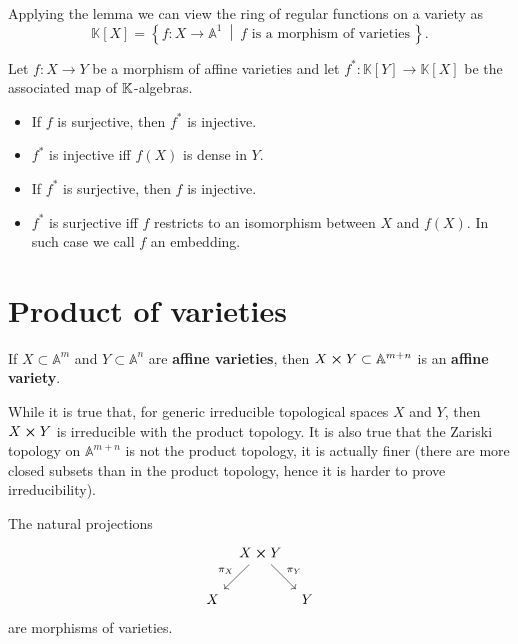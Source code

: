 \begin{rem}
	Applying the lemma we can view the ring of regular functions on a variety as
	\begin{equation}
	\mathbb{K}[X] = \left\{ f: X \to \mathbb{A}^1 \ \middle|\ f  \text{ is a morphism of varieties}\, \right\}
	.\end{equation} 
\end{rem} 

\begin{lem}
	Let $f: X \to Y$ be a morphism of affine varieties and let $f^*: \mathbb{K}[Y] \to \mathbb{K}[X]$ be the associated map of $\mathbb{K}$-algebras.
	\begin{itemize}
		\item If $f$ is surjective, then $f^*$ is injective.
		\item $f^*$ is injective iff $f(X)$ is dense in $Y$.
		\item If $f^*$ is surjective, then $f$ is injective.
		\item $f^*$ is surjective iff $f$ restricts to an isomorphism between $X$ and $f(X)$.
			In such case we call $f$ an embedding.
	\end{itemize}
\end{lem} 

\section{Product of varieties}
\begin{lem}
	If $X \subset \mathbb{A}^m$ and $Y \subset \mathbb{A}^n$ are \textbf{affine varieties}, then $X \cross Y \subset \mathbb{A}^{m+n}$ is an \textbf{affine variety}.
\end{lem} 
\begin{rem}
	While it is true that, for generic irreducible topological spaces $X$ and $Y$, then $X \cross Y$ is irreducible with the product topology.
	It is also true that the Zariski topology on $\mathbb{A}^{m+n}$ is not the product topology, it is actually finer (there are more closed subsets than in the product topology, hence it is harder to prove irreducibility).
\end{rem}

\begin{rem}
	The natural projections
	\begin{equation}
	\begin{tikzcd}[column sep=tiny]
		& X \cross Y \arrow[ld, "\pi_X"', rightarrow] \arrow[rd, "\pi_Y", rightarrow] & \\
		X & & Y
	\end{tikzcd}
	\end{equation} 
	are morphisms of varieties.
\end{rem}

